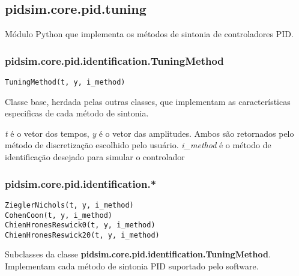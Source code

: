 \subsection{pidsim.core.pid.tuning}
    
    Módulo Python que implementa os métodos de sintonia de controladores
    \acs{PID}.
    
    \subsubsection{pidsim.core.pid.identification.TuningMethod}
        
        \begin{verbatim}
TuningMethod(t, y, i_method)\end{verbatim}
        
        Classe base, herdada pelas outras classes, que implementam as
        características especificas de cada método de sintonia.
        
        \textit{t} é o vetor dos tempos, \textit{y} é o vetor das amplitudes.
        Ambos são retornados pelo método de discretização escolhido pelo
        usuário. \textit{i\_method} é o método de identificação desejado
        para simular o controlador
    
    \subsubsection{pidsim.core.pid.identification.*}
        
        \begin{verbatim}
ZieglerNichols(t, y, i_method)
CohenCoon(t, y, i_method)
ChienHronesReswick0(t, y, i_method)
ChienHronesReswick20(t, y, i_method)\end{verbatim}
        
        Subclasses da classe \textbf{pidsim.core.pid.identification.TuningMethod}.
        Implementam cada método de sintonia \acs{PID} suportado pelo software.
